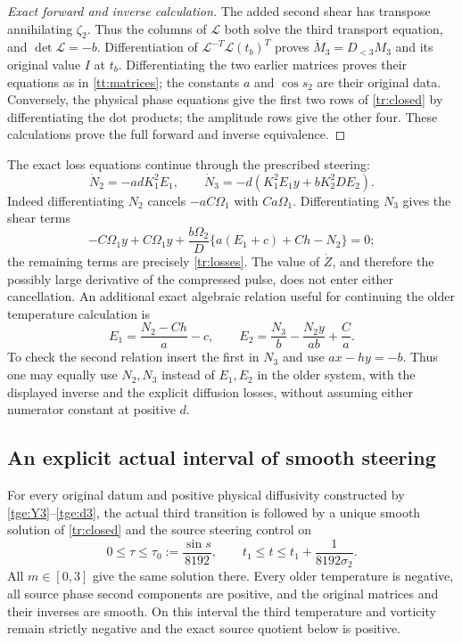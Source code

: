\begin{proof}[Exact forward and inverse calculation]
The added second shear has transpose annihilating $\zeta_2$.
Thus the columns of $\mathcal L$ both solve the third transport
equation, and $\det\mathcal L=-b$. Differentiation of
$\mathcal L^{-T}\mathcal L(t_b)^T$ proves
$\dot M_3=D_{<3}M_3$ and its original value $I$ at $t_b$.
Differentiating the two earlier matrices proves their equations as
in \eqref{tt:matrices}; the constants $a$ and $\cos s_2$ are
their original data. Conversely, the physical phase equations give
the first two rows of \eqref{tr:closed} by differentiating the dot
products; the amplitude rows give the other four. These calculations
prove the full forward and inverse equivalence.
\end{proof}

The exact loss equations continue through the prescribed steering:
\begin{equation}\label{tr:losses}
 \dot N_2=-adK_1^2E_1,\qquad
 \dot N_3=-d(K_1^2E_1y+bK_2^2DE_2).
\end{equation}
Indeed differentiating $N_2$ cancels $-aC\Omega_1$ with
$Ca\Omega_1$. Differentiating $N_3$ gives the shear terms
\[
 -C\Omega_1y+C\Omega_1y
 +\frac{b\Omega_2}{D}
       \{a(E_1+c)+Ch-N_2\}=0;
\]
the remaining terms are precisely \eqref{tr:losses}.
The value of $\dot Z$, and therefore the possibly large derivative
of the compressed pulse, does not enter either cancellation.
An additional exact algebraic relation useful for continuing the
older temperature calculation is
\begin{equation}\label{tr:temperature_inverse}
 E_1=\frac{N_2-Ch}{a}-c,\qquad
 E_2=\frac{N_3}{b}-\frac{N_2y}{ab}+\frac Ca.
\end{equation}
To check the second relation insert the first in $N_3$ and use
$ax-hy=-b$. Thus one may equally use $N_2,N_3$ instead of
$E_1,E_2$ in the older system, with the displayed inverse and
the explicit diffusion losses, without assuming either numerator
constant at positive $d$.

\subsection{An explicit actual interval of smooth steering}

\begin{theorem}\label{tr:local}
For every original datum and positive physical diffusivity constructed
by \eqref{tge:Y3}--\eqref{tge:d3}, the actual third transition is
followed by a unique smooth solution of \eqref{tr:closed} and the
source steering control on
\[
 0\leq\tau\leq\tau_0:=\frac{\sin s}{8192},
 \qquad
 t_1\leq t\leq t_1+\frac1{8192\sigma_2}.
\]
All $m\in[0,3]$ give the same solution there. Every older
temperature is negative, all source phase second components are
positive, and the original matrices and their inverses are smooth.
On this interval the third temperature and vorticity remain strictly
negative and the exact source quotient below is positive.
\end{theorem}

